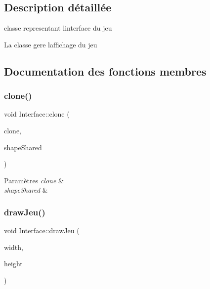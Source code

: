 \subsection{Description détaillée}
classe representant l\textquotesingle{}interface du jeu 

La classe gere l\textquotesingle{}affichage du jeu 

\subsection{Documentation des fonctions membres}
\mbox{\label{class_interface_a24e7aef887751ec6db3de173edc4e57a}} 
\subsubsection{\texorpdfstring{clone()}{clone()}}
{\footnotesize\ttfamily void Interface\+::clone (\begin{DoxyParamCaption}\item[{std\+::vector$<$ std\+::shared\+\_\+ptr$<$ \hyperlink{classgeometric_shape_1_1_shape}{geometric\+Shape\+::\+Shape} $>$$>$ \&}]{clone,  }\item[{std\+::vector$<$ std\+::shared\+\_\+ptr$<$ \hyperlink{classgeometric_shape_1_1_shape}{geometric\+Shape\+::\+Shape} $>$$>$ \&}]{shape\+Shared }\end{DoxyParamCaption})}


\begin{DoxyParams}{Paramètres}
{\em clone} & \\
\hline
{\em shape\+Shared} & \\
\hline
\end{DoxyParams}
\mbox{\label{class_interface_a0101527d22a169fb5ad0825b9efc9807}} 
\subsubsection{\texorpdfstring{draw\+Jeu()}{drawJeu()}}
{\footnotesize\ttfamily void Interface\+::draw\+Jeu (\begin{DoxyParamCaption}\item[{int}]{width,  }\item[{int}]{height }\end{DoxyParamCaption})}


